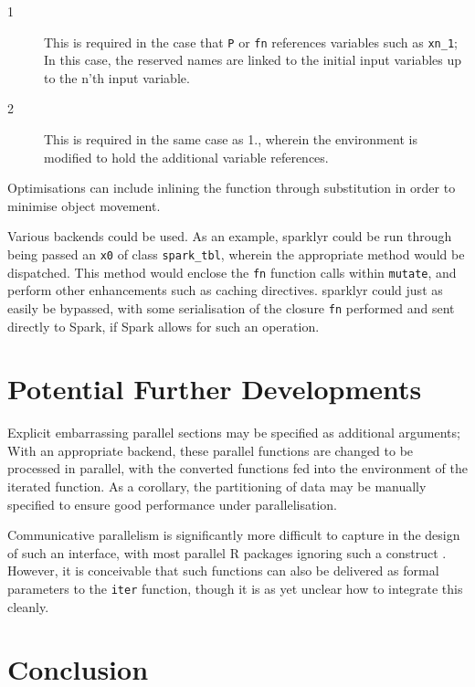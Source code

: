 \documentclass[a4paper,10pt]{article}
\begin{document}
\begin{description}
	\item[1] This is required in the case that \texttt{P} or \texttt{fn}
		references variables such as \texttt{xn\_1}; In this case, the
		reserved names are linked to the initial input variables up to
		the n'th input variable.
	\item[2] This is required in the same case as 1., wherein the
		environment is modified to hold the additional variable
		references.
\end{description}

Optimisations can include inlining the function through substitution in order
to minimise object movement.

Various backends could be used.
As an example, sparklyr could be run through being passed an \texttt{x0} of
class \texttt{spark\_tbl}, wherein the appropriate method would be dispatched.
This method would enclose the \texttt{fn} function calls within
\texttt{mutate}, and perform other enhancements such as caching directives.
sparklyr could just as easily be bypassed, with some serialisation of the
closure \texttt{fn} performed and sent directly to Spark, if Spark allows for
such an operation.

\section{Potential Further Developments}

Explicit embarrassing parallel sections may be specified as additional
arguments;
With an appropriate backend, these parallel functions are changed to be
processed in parallel, with the converted functions fed into the environment of
the iterated function.
As a corollary, the partitioning of data may be manually specified to ensure
good performance under parallelisation.

Communicative parallelism is significantly more difficult to capture in the
design of such an interface, with most parallel R packages ignoring such a
construct \cite{bengtsson20}\cite{core:_packag}\cite{matloff16softw_alchemy}
\cite{vaughan18}.
However, it is conceivable that such functions can also be delivered as formal
parameters to the \texttt{iter} function, though it is as yet unclear how to
integrate this cleanly.

\section{Conclusion}
\end{document}
